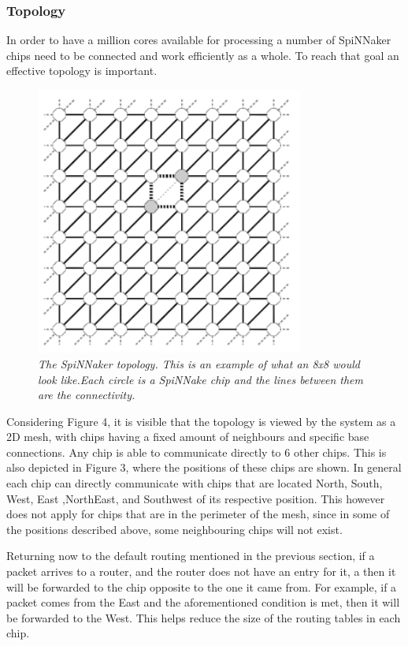 \documentclass[12pt,a4paper]{article}
\begin{document}
\subsubsection{Topology}
In order to have a million cores available for processing a number of SpiNNaker chips need to be connected and work efficiently as a whole. To reach that goal an effective topology is important.
\begin{figure}[h!]
\includegraphics[width=250pt,height=250pt,scale=2]{Pics/topology.png}
\centering
\caption{
\emph{The SpiNNaker topology\cite{navaridas2009understanding}. This is an example of what an 8x8 would look like.Each circle is a SpiNNake chip and the lines between them are the connectivity.}}
\end{figure}
\vspace{20pt}
Considering Figure 4, it is visible that the topology is viewed by the system as a 2D mesh, with chips having a fixed amount of neighbours and specific base connections. Any chip is able to communicate directly to 6 other chips. This is also depicted in Figure 3, where the positions of these chips are shown. In general each chip can directly communicate with chips that are located North, South, West, East ,NorthEast, and Southwest of its respective position. This however does not apply for chips that are in the perimeter of the mesh, since in some of the positions described above, some neighbouring chips will not exist\cite{furber2012overview}. 

Returning now to the default routing mentioned in the previous section, if a packet arrives to a router, and the router does not have an entry for it, a then it will be forwarded to the chip opposite to the one it came from. For example, if a packet comes from the East and the aforementioned condition is met, then it will be forwarded to the West. This helps reduce the size of the routing tables in each chip\cite{khan2008spinnaker}.
\end{document}
